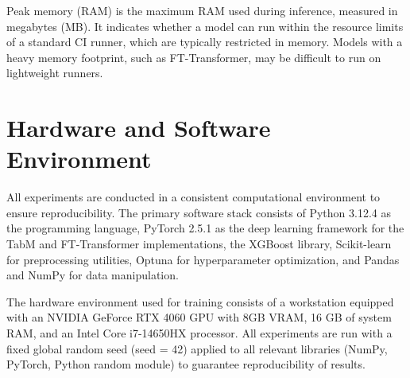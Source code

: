 Peak memory (RAM) is the maximum RAM used during inference, measured in megabytes (MB). It indicates whether a model can run within the resource limits of a standard CI runner, which are typically restricted in memory. Models with a heavy memory footprint, such as FT-Transformer, may be difficult to run on lightweight runners.


\section{Hardware and Software Environment}
All experiments are conducted in a consistent computational environment to ensure reproducibility. The primary software stack consists of Python 3.12.4 as the programming language, PyTorch 2.5.1 as the deep learning framework for the TabM and FT-Transformer implementations, the XGBoost library, Scikit-learn for preprocessing utilities, Optuna for hyperparameter optimization, and Pandas and NumPy for data manipulation.

The hardware environment used for training consists of a workstation equipped with an NVIDIA GeForce RTX 4060 GPU with 8GB VRAM, 16 GB of system RAM, and an Intel Core  i7-14650HX processor. All experiments are run with a fixed global random seed (seed = 42) applied to all relevant libraries (NumPy, PyTorch, Python random module) to guarantee reproducibility of results.
